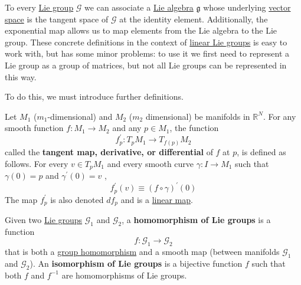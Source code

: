   To every \hyperref[def:lie-group]{Lie group} $\mathcal{G}$ we can associate a \hyperref[def:lie-algebra]{Lie algebra} $\mathfrak{g}$ whose underlying \hyperref[def:vector-space]{vector space} is the tangent space of $\mathcal{G}$ at the identity element. Additionally, the exponential map allows us to map elements from the Lie algebra to the Lie group. These concrete definitions in the context of \hyperref[def:linear-lie-group]{linear Lie groups} is easy to work with, but has some minor problems: to use it we first need to represent a Lie group as a group of matrices, but not all Lie groups can be represented in this way. 

  To do this, we must introduce further definitions. 

  \begin{definition}
    \label{def:tangent-map-of-a-smooth-function}
    Let $M_1$ ($m_1$-dimensional) and $M_2$ ($m_2$ dimensional) be manifolds in $\mathbb{R}^N$. For any smooth function $f: M_1 \rightarrow M_2$ and any $p \in M_1$, the function 
    \begin{equation}
      f^\prime_p: T_p M_1 \rightarrow T_{f(p)} M_2
    \end{equation}
    called the \textbf{tangent map, derivative, or differential} of $f$ at $p$, is defined as follows. For every $v \in T_p M_1$ and every smooth curve $\gamma: I \rightarrow M_1$ such that $\gamma(0) = p$ and $\gamma^\prime (0) = v$ , 
    \begin{equation}
      f^\prime_p(v) \equiv (f \circ \gamma)^\prime (0)
    \end{equation}
    The map $f^\prime_p$ is also denoted $d f_p$ and is a \hyperref[thm:linear-map]{linear map}. 
  \end{definition}

  \begin{definition}
    \label{def:homomorphism-of-lie-groups}
    Given two \hyperref[def:lie-group]{Lie groups} $\mathcal{G}_1$ and $\mathcal{G}_2$, a \textbf{homomorphism of Lie groups} is a function 
    \begin{equation}
      f: \mathcal{G}_1 \rightarrow \mathcal{G}_2
    \end{equation}
    that is both a \hyperref[def:group-homomorphism]{group homomorphism} and a smooth map (between manifolds $\mathcal{G}_1$ and $\mathcal{G}_2$). An \textbf{isomorphism of Lie groups} is a bijective function $f$ such that both $f$ and $f^{-1}$ are homomorphisms of Lie groups. 
  \end{definition}

